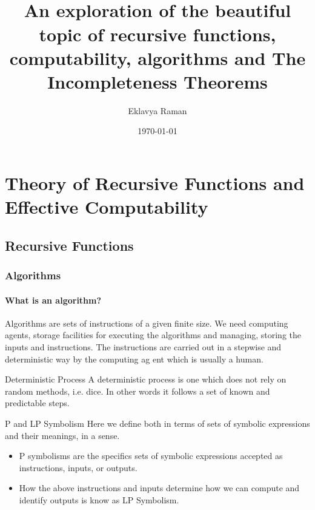 \documentclass[openany]{book}
\begin{document}
\title{\Large{} \\ \vspace{5pt}
\large{An exploration of the beautiful topic of recursive functions, computability, algorithms and The Incompleteness Theorems}}
\author{Eklavya Raman}
\date{\today}
\maketitle
\tableofcontents
\listoftheorems[
    show=mytheorem,
    title={List of Theorems}]
\part{Theory of Recursive Functions and Effective Computability}
\chapter{Recursive Functions}


\section{Algorithms}
\subsection{What is an algorithm?}
Algorithms are sets of instructions of a given finite size. We need computing agents, storage facilities for executing the algorithms and managing, storing the inputs and instructions. The instructions are carried out in a stepwise and deterministic way by the computing ag ent which is usually a human.
\begin{mydefinition}{Deterministic Process}
    A deterministic process is one which does not rely on random methods, i.e. dice. In other words it follows a set of known and predictable steps. 
\end{mydefinition}
\begin{mydefinition}{P and LP Symbolism}
Here we define both in terms of sets of symbolic expressions and their meanings, in a sense. 
\begin{itemize}
    \item P symbolisms are the specifics sets of symbolic expressions accepted as instructions, inputs, or outputs. 
    \item How the above instructions and inputs determine how we can compute and identify outputs is know as LP Symbolism. 
\end{itemize}
\end{mydefinition}
\end{document}
